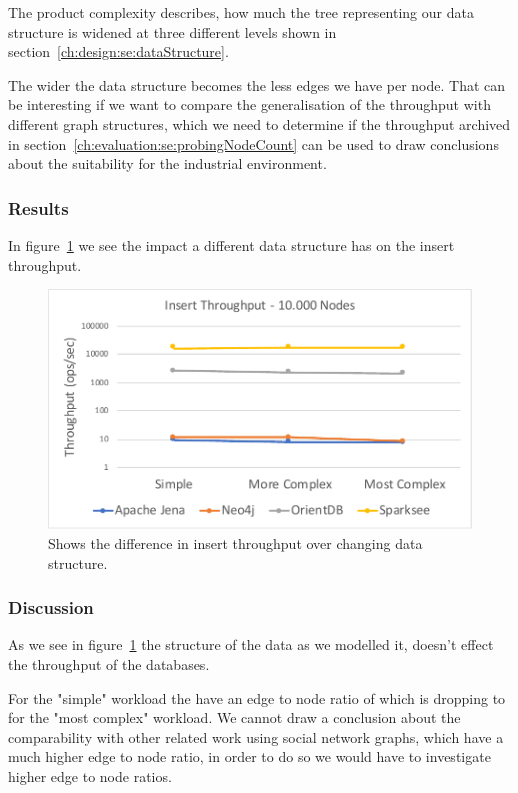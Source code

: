 The product complexity describes,
how much the tree representing our data structure is widened at three different levels shown in section~\ref{ch:design:se:dataStructure}.

The wider the data structure becomes the less edges we have per node.
That can be interesting if we want to compare the generalisation of the throughput with different graph structures,
which we need to determine if the throughput archived in section~\ref{ch:evaluation:se:probingNodeCount} can be used to draw conclusions about the suitability for the industrial environment.

\subsubsection{Results}
In figure~\ref{fig:structure} we see the impact a different data structure has on the insert throughput.

\begin{figure}[h!]
  \centering
  \includegraphics[width=.75\textwidth]{images/production/structure}
  \caption{Shows the difference in insert throughput over changing data structure.}
  \label{fig:structure}
\end{figure}

\subsubsection{Discussion}
As we see in figure~\ref{fig:structure} the structure of the data as we modelled it,
doesn't effect the throughput of the databases.

For the "simple" workload the have an edge to node ratio of  which is dropping to  for the "most complex" workload.
We cannot draw a conclusion about the comparability with other related work using social network graphs,
which have a much higher edge to node ratio,
in order to do so we would have to investigate higher edge to node ratios.

